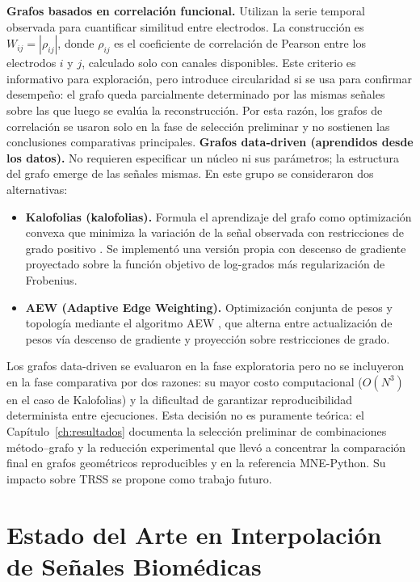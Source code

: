 \textbf{Grafos basados en correlación funcional.} Utilizan la serie temporal observada para cuantificar similitud entre electrodos. La construcción es $W_{ij} = |\rho_{ij}|$, donde $\rho_{ij}$ es el coeficiente de correlación de Pearson entre los electrodos $i$ y $j$, calculado solo con canales disponibles. Este criterio es informativo para exploración, pero introduce circularidad si se usa para confirmar desempeño: el grafo queda parcialmente determinado por las mismas señales sobre las que luego se evalúa la reconstrucción. Por esta razón, los grafos de correlación se usaron solo en la fase de selección preliminar y no sostienen las conclusiones comparativas principales.
\textbf{Grafos data-driven (aprendidos desde los datos).} No requieren especificar un núcleo ni sus parámetros; la estructura del grafo emerge de las señales mismas. En este grupo se consideraron dos alternativas:
\begin{itemize}[leftmargin=*,itemsep=1pt,topsep=2pt]
\item \textbf{Kalofolias (kalofolias).} Formula el aprendizaje del grafo como optimización convexa que minimiza la variación de la señal observada con restricciones de grado positivo \cite{kalofolias_how_2016}. Se implementó una versión propia con descenso de gradiente proyectado sobre la función objetivo de log-grados más regularización de Frobenius.
\item \textbf{AEW (Adaptive Edge Weighting).} Optimización conjunta de pesos y topología mediante el algoritmo AEW \cite{shekkizhar2020}, que alterna entre actualización de pesos vía descenso de gradiente y proyección sobre restricciones de grado.
\end{itemize}
Los grafos data-driven se evaluaron en la fase exploratoria pero no se incluyeron en la fase comparativa por dos razones: su mayor costo computacional ($O(N^3)$ en el caso de Kalofolias) y la dificultad de garantizar reproducibilidad determinista entre ejecuciones. Esta decisión no es puramente teórica: el Capítulo~\ref{ch:resultados} documenta la selección preliminar de combinaciones método--grafo y la reducción experimental que llevó a concentrar la comparación final en grafos geométricos reproducibles y en la referencia MNE-Python. Su impacto sobre TRSS se propone como trabajo futuro.

\section{Estado del Arte en Interpolación de Señales Biomédicas}

